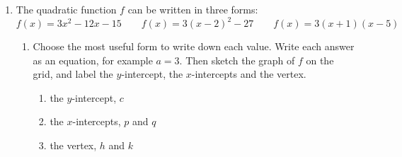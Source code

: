 \documentclass[12pt, twoside]{article}
\begin{document}
\begin{enumerate}[itemsep=0.15cm]

\item[1.]
The quadratic function $f$ can be written in three forms:
\[
f(x) = 3x^{2} - 12x - 15 \qquad
f(x) = 3(x - 2)^{2} - 27 \qquad
f(x) = 3(x + 1)(x - 5)
\]
\begin{enumerate}[itemsep=0.1cm]
  \item Choose the most useful form to write down each value. Write each
  answer as an equation, for example $a = 3$. Then sketch the graph of $f$
  on the grid, and label the $y$-intercept, the $x$-intercepts and the
  vertex.

  \noindent
  \begin{minipage}[t]{0.5\linewidth}
  \vspace{0pt}
  \begin{enumerate}[label=(\roman*), itemsep=0cm]
    \item the $y$-intercept, $c$
    \vspace{2.3cm}
    \item the $x$-intercepts, $p$ and $q$
    \vspace{2.3cm}
    \item the vertex, $h$ and $k$
  \end{enumerate}
  \end{minipage}%
  \begin{minipage}[t]{0.5\linewidth}
  \vspace{0pt}
  \begin{flushright}
  \end{flushright}
  \end{minipage}


\end{enumerate}
\end{enumerate}
\end{document}
